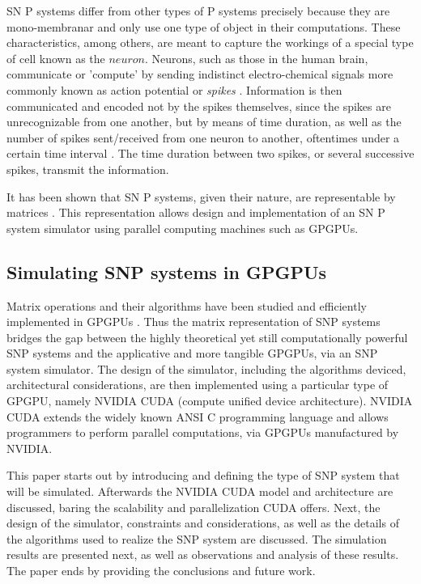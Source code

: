 \documentclass{acm_proc_article-sp}
\begin{document}
SN P systems differ from other types of P systems precisely because they are mono-membranar and only use one type of object in their computations. These characteristics, among others, are meant to capture the workings of a special type of cell known as the $neuron$. Neurons, such as those in the human brain, communicate or 'compute' by sending indistinct electro-chemical  signals more commonly known as action potential or \textit{spikes} \cite{snp}. Information is then communicated and encoded not by the spikes themselves, since the spikes are unrecognizable from one another, but by means of time duration, as well as the number of spikes sent/received from one neuron to another, oftentimes under a certain time interval \cite{snp}. The time duration between two spikes, or several successive spikes, transmit the information.  

It has been shown that SN P systems, given their nature, are representable by matrices \cite{snpbrain}\cite{snpmat}. This representation allows design and implementation of an SN P system simulator using parallel computing machines such as GPGPUs. 


\subsection{Simulating SNP systems in GPGPUs}
Matrix operations and their algorithms have been studied and efficiently implemented in GPGPUs \cite{matrixgpu1}\cite{matrixgpu2}. Thus the matrix representation of SNP systems bridges the gap between the highly theoretical yet still computationally powerful SNP systems and the applicative and more tangible GPGPUs, via an SNP system simulator. The design of the simulator, including the algorithms deviced, architectural considerations, are then implemented using a particular type of GPGPU, namely NVIDIA CUDA (compute unified device architecture). NVIDIA CUDA extends the widely known ANSI C programming language and allows programmers to perform parallel computations, via GPGPUs manufactured by NVIDIA.

This paper starts out by introducing and defining the type of SNP system that will be simulated. Afterwards the NVIDIA CUDA model and architecture are discussed, baring the scalability and parallelization CUDA offers. Next, the design of the simulator, constraints and considerations, as well as the details of the algorithms used to realize the SNP system are discussed. The simulation results are presented next, as well as observations and analysis of these results. The paper ends by providing the conclusions and future work.
\end{document}
